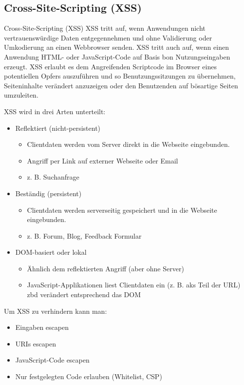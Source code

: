\subsection{Cross-Site-Scripting (XSS)}

\begin{defi}{Cross-Site-Scripting (XSS)}
    XSS tritt auf, wenn Anwendungen nicht vertrauenswürdige Daten entgegennehmen und ohne Validierung oder Umkodierung an einen Webbrowser senden.
    XSS tritt auch auf, wenn einen Anwendung HTML- oder JavaScript-Code auf Basis bon Nutzungseingaben erzeugt.
    XSS erlaubt es dem Angreifenden Scriptcode im Browser eines potentiellen Opfers auszuführen und so Benutzungssitzungen zu übernehmen, Seiteninhalte verändert anzuzeigen oder den Benutzenden auf bösartige Seiten umzuleiten.

    XSS wird in drei Arten unterteilt:
    \begin{itemize}
        \item Reflektiert (nicht-persistent)
              \begin{itemize}
                  \item Clientdaten werden vom Server direkt in die Webseite eingebunden.
                  \item Angriff per Link auf externer Webseite oder Email
                  \item z. B. Suchanfrage
              \end{itemize}
        \item Beständig (persistent)
              \begin{itemize}
                  \item Clientdaten werden serverseitig gespeichert und in die Webseite eingebunden.
                  \item z. B. Forum, Blog, Feedback Formular
              \end{itemize}
        \item DOM-basiert oder lokal
              \begin{itemize}
                  \item Ähnlich dem reflektierten Angriff (aber ohne Server)
                  \item JavaScript-Applikationen liest Clientdaten ein (z. B. aks Teil der URL) zbd verändert entsprechend das DOM
              \end{itemize}
    \end{itemize}

    Um XSS zu verhindern kann man:
    \begin{itemize}
        \item Eingaben escapen
        \item URIs escapen
        \item JavaScript-Code escapen
        \item Nur festgelegten Code erlauben (Whitelist, CSP)
    \end{itemize}
\end{defi}

